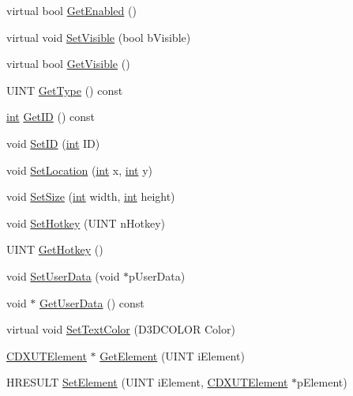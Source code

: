 \begin{DoxyCompactItemize}
\item 
virtual bool \hyperlink{class_c_d_x_u_t_control_a9d556d25a81317b1499b4cb292ba974b}{GetEnabled} ()
\item 
virtual void \hyperlink{class_c_d_x_u_t_control_a13061e9ab7d8d4398de7bde72d46a65d}{SetVisible} (bool bVisible)
\item 
virtual bool \hyperlink{class_c_d_x_u_t_control_a054da7df1c749c7462d2d2d3a391a638}{GetVisible} ()
\item 
UINT \hyperlink{class_c_d_x_u_t_control_aa251f3cc545d44bf6296b1ca1e0b8c42}{GetType} () const 
\item 
\hyperlink{_d_x_u_tgui_8cpp_a2d77ed03302b6978834ee3b6f57837fb}{int} \hyperlink{class_c_d_x_u_t_control_ad8c4cecdf845ce2d533b382747ed4a02}{GetID} () const 
\item 
void \hyperlink{class_c_d_x_u_t_control_a0bcbb04531ab93e528be2a085f08d435}{SetID} (\hyperlink{_d_x_u_tgui_8cpp_a2d77ed03302b6978834ee3b6f57837fb}{int} ID)
\item 
void \hyperlink{class_c_d_x_u_t_control_af2ca522955dcff3847ca6d026fedca99}{SetLocation} (\hyperlink{_d_x_u_tgui_8cpp_a2d77ed03302b6978834ee3b6f57837fb}{int} x, \hyperlink{_d_x_u_tgui_8cpp_a2d77ed03302b6978834ee3b6f57837fb}{int} y)
\item 
void \hyperlink{class_c_d_x_u_t_control_a47b1e68fca8f2a37499bb12eaad9145d}{SetSize} (\hyperlink{_d_x_u_tgui_8cpp_a2d77ed03302b6978834ee3b6f57837fb}{int} width, \hyperlink{_d_x_u_tgui_8cpp_a2d77ed03302b6978834ee3b6f57837fb}{int} height)
\item 
void \hyperlink{class_c_d_x_u_t_control_a020165444594a5fa2391ee2ef133e355}{SetHotkey} (UINT nHotkey)
\item 
UINT \hyperlink{class_c_d_x_u_t_control_a693c6f243a46206fec1cc2d5ef6c5556}{GetHotkey} ()
\item 
void \hyperlink{class_c_d_x_u_t_control_a1545674f9f77e192fb5b7151a29d5862}{SetUserData} (void $\ast$pUserData)
\item 
void $\ast$ \hyperlink{class_c_d_x_u_t_control_ae0d69e33c788ebb827c02886b1ab8ff9}{GetUserData} () const 
\item 
virtual void \hyperlink{class_c_d_x_u_t_control_a9132bb5d6b1d2bff1f20df33fec8c98b}{SetTextColor} (D3DCOLOR Color)
\item 
\hyperlink{class_c_d_x_u_t_element}{CDXUTElement} $\ast$ \hyperlink{class_c_d_x_u_t_control_a4f6164a6360791491abcf9fdeebf3f6d}{GetElement} (UINT iElement)
\item 
HRESULT \hyperlink{class_c_d_x_u_t_control_a9aff35c5836ad9406f7ec3f8bedde0d6}{SetElement} (UINT iElement, \hyperlink{class_c_d_x_u_t_element}{CDXUTElement} $\ast$pElement)
\end{DoxyCompactItemize}
